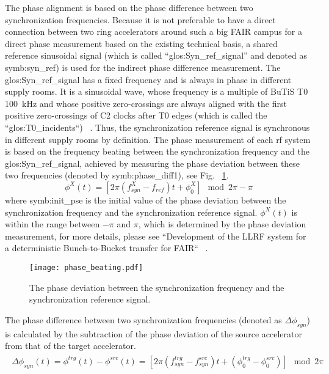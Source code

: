 The phase alignment is based on the phase difference between two synchronization frequencies. Because it is not preferable to have a direct connection between two ring accelerators around such a big FAIR campus for a direct phase measurement based on the existing technical basis, a shared reference sinusoidal signal (which is called “\gls{glos:Syn_ref_signal}” and denoted as \gls{symb:syn_ref}) is used for the indirect phase difference measurement. The \gls{glos:Syn_ref_signal} has a fixed frequency and is always in phase in different supply rooms. It is a sinusoidal wave, whose frequency is a multiple of BuTiS T0 \SI{100}{kHz} and whose positive zero-crossings are always aligned with the first positive zero-crossings of C2 clocks after T0 edges (which is called the ``\gls{glos:T0_incidents}``) ~\cite{ferrand_system_2014, ferrand_system_2015}. Thus, the synchronization reference signal is synchronous in different supply rooms by definition. The phase measurement of each rf system is based on the frequency beating between the synchronization frequency and the \gls{glos:Syn_ref_signal}, achieved by measuring the phase deviation between these two frequencies (denoted by \gls{symb:phase_diff1}), see Fig. ~\ref{phase_diffe_align}. 
\begin{equation}
\phi^X(t)= [2\pi(f_\mathit{syn}^{X}-f_\mathit{ref})t+\phi^X_0] \mod 2\pi - \pi
\end{equation}
where \gls{symb:init_pse} is the initial value of the phase deviation between the synchronization frequency and the synchronization reference signal. $\phi^X(t)$ is within the range between $-\pi$ and $\pi$, which is determined by the phase deviation measurement, for more details, please see ``Development of the LLRF system for a deterministic Bunch-to-Bucket transfer for FAIR`` ~\cite{ferrand_development_nodate}.
\begin{figure}[!htb]
   \centering   
   \texttt{[image: phase\_beating.pdf]}
   \caption{The phase deviation between the synchronization frequency and the synchronization reference signal.}
   \label{phase_diffe_align}
\end{figure}

The phase difference between two synchronization frequencies (denoted as $\Delta \phi_\mathit{syn}$) is calculated by the subtraction of the phase deviation of the source accelerator from that of the target accelerator. 
\begin{eqnarray}
\begin{aligned}
\Delta \phi_\mathit{syn}(t)
=\phi^\mathit{trg}(t)-\phi^\mathit{src}(t)=[2\pi(f_\mathit{syn}^{trg}-f_\mathit{syn}^{src})t+(\phi^\mathit{trg}_0-\phi^\mathit{src}_0)] \mod 2\pi
\label{phase_diff_dev}
\end{aligned}
\end{eqnarray}

